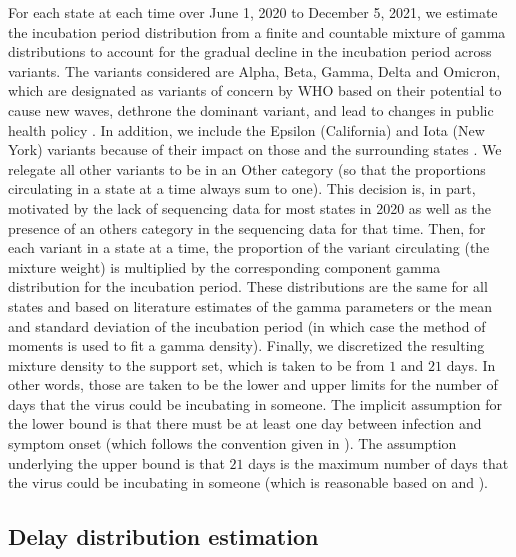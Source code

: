 \documentclass{article}
\begin{document}
For each state at each time over June 1, 2020 to December 5, 2021, we estimate
the incubation period distribution from a finite and countable mixture of gamma
distributions to account for the gradual decline in the incubation period across
variants. The variants considered are Alpha, Beta, Gamma, Delta and Omicron,
which are designated as variants of concern by WHO based on their potential to
cause new waves, dethrone the dominant variant, and lead to changes in public
health policy \citep{who2021tracking}. In addition, we include the Epsilon
(California) and Iota (New York) variants because of their impact on those and
the surrounding states \citep{yang2022investigation, duerr2021dominance}. We
relegate all other variants to be in an Other category (so that the proportions
circulating in a state at a time always sum to one). This decision is, in part,
motivated by the lack of sequencing data for most states in 2020 as well as the
presence of an others category in the sequencing data for that time. 
Then, for each variant in a state at a time, the proportion of the variant
circulating (the mixture weight) is multiplied by the corresponding component
gamma distribution for the incubation period. These distributions are the same
for all states and based on literature estimates of the gamma parameters or the
mean and standard deviation of the incubation period (in which case the method
of moments is used to fit a gamma density). Finally, we discretized the
resulting mixture density to the support set, which is taken to be from $1$ and
$21$ days. In other words, those are taken to be the lower and upper limits for
the number of days that the virus could be incubating in someone. The implicit
assumption for the lower bound is that there must be at least one day between
infection and symptom onset (which follows the convention given in
\citet{phcan2021covid}). The assumption underlying the upper bound is that $21$
days is the maximum number of days that the virus could be incubating in someone
(which is reasonable based on \citet{zaki2021estimations} and
\citet{cortes2022sars}).

\subsection{Delay distribution estimation} 
\end{document}
